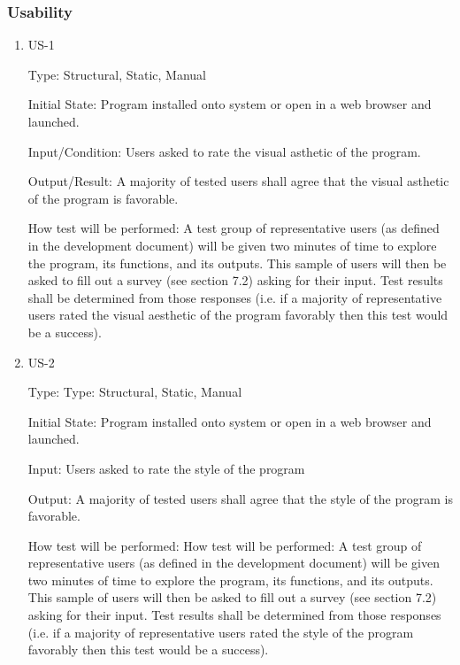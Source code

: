 \documentclass[12pt, titlepage]{article}
\begin{document}
\subsubsection{Usability}

\begin{enumerate}

\item{US-1\\}

Type: Structural, Static, Manual
					
Initial State: Program installed onto system or open in a web browser and launched.
					
Input/Condition: Users asked to rate the visual asthetic of the program.
					
Output/Result: A majority of tested users shall agree that the visual asthetic of the program is favorable.
					
How test will be performed: A test group of representative users (as defined in the development document) will be given two minutes of time to explore the program, its functions, and its outputs. This sample of users will then be asked to fill out a survey (see section 7.2) asking for their input. Test results shall be determined from those responses (i.e. if a majority of representative users rated the visual aesthetic of the program favorably then this test would be a success).
					
\item{US-2\\}

Type: Type: Structural, Static, Manual
					
Initial State: Program installed onto system or open in a web browser and launched.
					
Input: Users asked to rate the style of the program
					
Output: A majority of tested users shall agree that the style of the program is favorable.
					
How test will be performed: How test will be performed: A test group of representative users (as defined in the development document) will be given two minutes of time to explore the program, its functions, and its outputs. This sample of users will then be asked to fill out a survey (see section 7.2) asking for their input. Test results shall be determined from those responses (i.e. if a majority of representative users rated the style of the program favorably then this test would be a success).

\end{enumerate}
\end{document}
